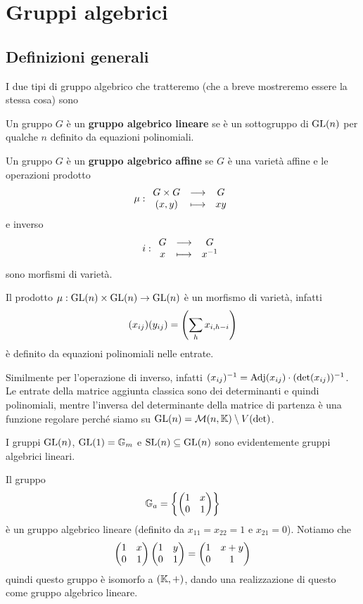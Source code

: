 \chapter{Gruppi algebrici}

\section{Definizioni generali}
I due tipi di gruppo algebrico che tratteremo (che a breve mostreremo essere la stessa cosa) sono
\begin{definition}
Un gruppo $G$ \`e un \textbf{gruppo algebrico lineare} se \`e un sottogruppo di $\operatorname{GL}(n)$ per qualche $n$ definito da equazioni polinomiali.
\end{definition}

\begin{definition}
Un gruppo $G$ \`e un \textbf{gruppo algebrico affine} se $G$ \`e una variet\`a affine e le operazioni prodotto
\[\mu:\begin{array}{ccc} {G\times G} & \longrightarrow & {G}\\ {(x,y)} & \longmapsto & {xy} \end{array}\]
e inverso
\[i:\begin{array}{ccc} {G} & \longrightarrow & {G}\\ {x} & \longmapsto & {x^{-1}} \end{array}\]
sono morfismi di variet\`a.
\end{definition}

\begin{remark}
Il prodotto $\mu:\operatorname{GL}(n)\times\operatorname{GL}(n)\to\operatorname{GL}(n)$ \`e un morfismo di variet\`a, infatti
\[(x_{ij})(y_{ij})=\left({\sum_h x_{i,h-i}}\right)\]
\`e definito da equazioni polinomiali nelle entrate.

Similmente per l'operazione di inverso, infatti $(x_{ij})^{-1}=\operatorname{Adj}(x_{ij})\cdot (\det(x_{ij}))^{-1}$. Le entrate della matrice aggiunta classica sono dei determinanti e quindi polinomiali, mentre l'inversa del determinante della matrice di partenza \`e una funzione regolare perch\'e siamo su $\operatorname{GL}(n)=\mathcal{M}(n,\mathbb{K})\setminus V(\det)$.
\end{remark}

\begin{example}
I gruppi $\operatorname{GL}(n)$, $\operatorname{GL}(1)=\mathbb{G}_m$ e $\operatorname{SL}(n)\subseteq \operatorname{GL}(n)$ sono evidentemente gruppi algebrici lineari.
\end{example}

\begin{example}
Il gruppo
\[\mathbb{G}_a=\left\{{\begin{pmatrix}1&x\\0&1\end{pmatrix}}\right\}\]
\`e un gruppo algebrico lineare (definito da $x_{11}=x_{22}=1$ e $x_{21}=0$). Notiamo che
\[\begin{pmatrix}1&x\\0&1\end{pmatrix}\begin{pmatrix}1&y\\0&1\end{pmatrix}=\begin{pmatrix}1&x+y\\0&1\end{pmatrix}\]
quindi questo gruppo \`e isomorfo a $(\mathbb{K},+)$, dando una realizzazione di questo come gruppo algebrico lineare.
\end{example}

